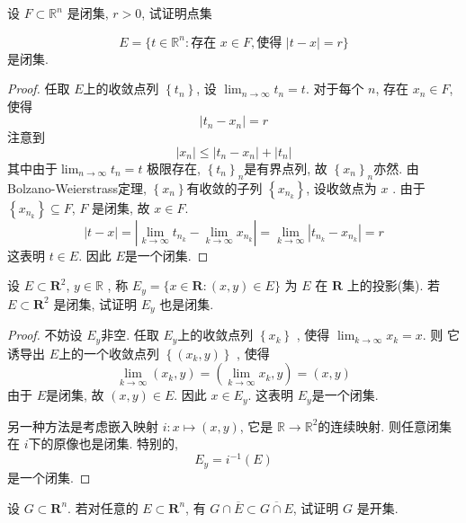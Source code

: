 \documentclass[../main.tex]{subfiles}
\begin{document}
\begin{exercise}{}{}
    设 $F \subset \mathbb{R}^n$ 是闭集, $r>0$, 试证明点集

$$E = \{t \in \mathbb{R}^n : \text{存在 } x \in F, \text{使得 } |t-x| = r\}$$
是闭集.
\end{exercise}
\begin{proof}
    任取 \(  E  \)上的收敛点列  \(  \left\{ t_{n} \right\}  \), 设 \(  \lim_{n\to \infty}t_{n}= t  \).  对于每个 \(  n  \), 存在 \(  x_{n}\in F  \), 使得 \[
    \left| t_{n}-x_{n} \right|= r 
    \]   注意到 \[
    \left| x_{n} \right|\le \left| t_{n}-x_{n} \right|+ \left| t _{n}\right|   
    \]其中由于\(\lim_{n\to \infty}t_{n}= t  \) 极限存在,  \(  \left\{ t_{n}\right\}_{n}  \)是有界点列, 故 \(  \left\{ x_{n} \right\}_{n}  \)亦然.  由Bolzano-Weierstrass定理,  \(  \left\{ x_{n} \right\}  \)有收敛的子列  \(  \left\{ x_{n_{k}} \right\}  \), 设收敛点为 \(  x  \) . 由于 \(  \left\{ x_{n_{k}} \right\}\subseteq F  \), \(  F  \) 是闭集, 故 \(  x \in F  \). \[
    \left| t-x \right|= \left| \lim_{k\to \infty}t_{n_{k}}-\lim_{k\to \infty}x_{n_{k}} \right|= \lim_{k\to \infty}\left| t_{n_{k}} -x_{n_{k}}\right|= r   
    \] 这表明 \(  t \in E  \). 因此 \(  E  \)是一个闭集.  
\end{proof}
\begin{exercise}{}{}
设 $E \subset \mathbf{R}^2$, \(   y \in \mathbb{R}   \) , 称 $E_y = \{x \in \mathbf{R} : (x,y) \in E\}$ 为 $E$ 在 $\mathbf{R}$ 上的投影(集). 若 $E \subset \mathbf{R}^2$ 是闭集, 试证明 $E_y$ 也是闭集.
\end{exercise}

\begin{proof}
   不妨设 \(  E_{y}  \)非空.  任取 \(  E_{y}  \)上的收敛点列 \(  \left\{ x_{k} \right\}  \)  , 使得 \(  \lim_{k\to \infty}x_{k}= x  \). 则 它诱导出 \(  E  \)上的一个收敛点列 \(  \left\{ \left( x_{k},y \right)  \right\}  \)   , 使得 \[
    \lim_{k\to \infty}\left( x_{k},y \right)= \left( \lim_{k\to \infty}x_{k},y \right)  = \left( x,y \right) 
    \]由于 \(  E  \)是闭集, 故 \(  \left( x,y  \right)\in E   \). 因此 \(  x \in E_{y}  \). 这表明 \(  E_{y}  \)是一个闭集.
    
    
    另一种方法是考虑嵌入映射 \(   i: x\mapsto \left( x,y \right)    \), 它是 \(  \mathbb{R} \to \mathbb{R}  ^{2} \)的连续映射.  则任意闭集在 \(i \)下的原像也是闭集. 特别的,  \[
  E_{y}=  i ^{-1} \left( E \right) 
    \]是一个闭集. 
\end{proof}
\begin{exercise}{}{}
设 $G \subset \mathbf{R}^n$. 若对任意的 $E \subset \mathbf{R}^n$, 有 $G \cap \overline{E} \subset \overline{G \cap E}$, 试证明 $G$ 是开集.
\end{exercise}
\end{document}
